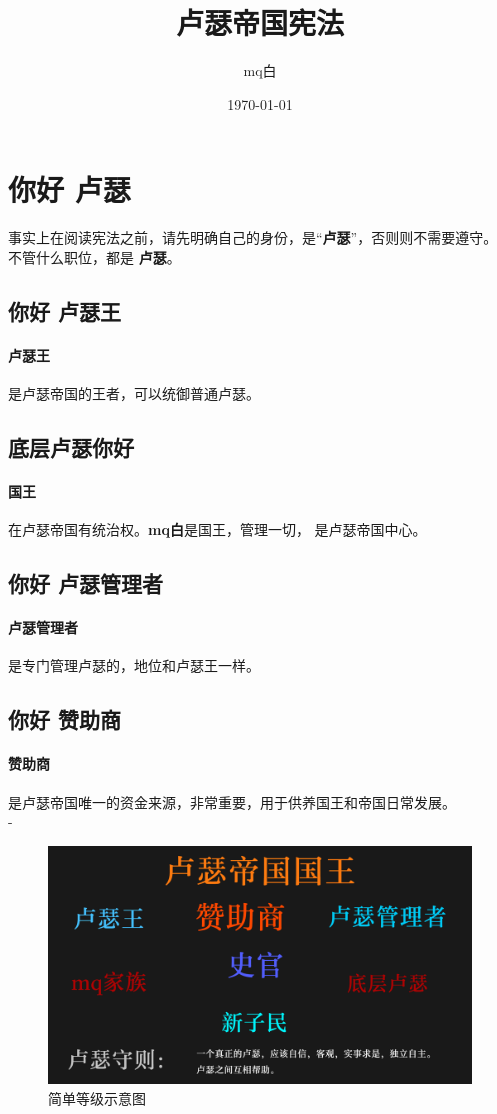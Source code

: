 \documentclass[UTF8,11pt,a4paper]{ctexart}
\title{卢瑟帝国宪法 }
\author{mq白}
\date{\today}
\begin{document}
\maketitle
\section{你好 卢瑟}
事实上在阅读宪法之前，请先明确自己的身份，是“\textbf{卢瑟}”，否则则不需要遵守。
不管什么职位，都是 \textbf{卢瑟}。
\subsection{你好 卢瑟王}
\paragraph{卢瑟王}是卢瑟帝国的王者，可以统御普通卢瑟。
\subsection{底层卢瑟你好}
\paragraph{国王}在卢瑟帝国有统治权。\textbf{mq白}是国王，管理一切， 是卢瑟帝国中心。
\subsection{你好 卢瑟管理者}
\paragraph{卢瑟管理者}是专门管理卢瑟的，地位和卢瑟王一样。

\subsection{你好 赞助商}
\paragraph{赞助商}是卢瑟帝国唯一的资金来源，非常重要，用于供养国王和帝国日常发展。\\
{\color{white}-}
\begin{figure}[H]
    \caption{简单等级示意图} 
    \centering 
    \includegraphics[width = .7\textwidth]{resource/luse.png}
\end{figure}

 
\end{document}
